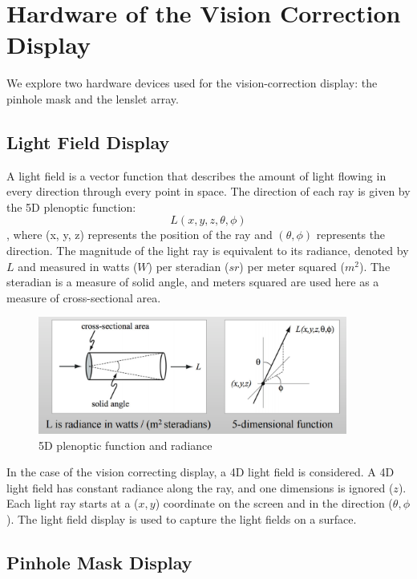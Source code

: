 \chapter{Hardware of the Vision Correction Display}

We explore two hardware devices used for the vision-correction display: the pinhole mask and the lenslet array.

\section{Light Field Display}
A light field is a vector function that describes the amount of light flowing in every direction through every point in space. The direction of each ray is given by the 5D plenoptic function: $$L(x, y, z, \theta, \phi)$$, where (x, y, z) represents the position of the ray and $(\theta, \phi)$ represents the direction. The magnitude of the light ray is equivalent to its radiance, denoted by $L$ and measured in watts ($W$) per steradian ($sr$) per meter squared ($m^2$). The steradian is a measure of solid angle, and meters squared are used here as a measure of cross-sectional area.

\begin{figure}[ht]
  \centering
  \includegraphics[width=4in]{chapters/chapter3/images/light_field.png}
  \caption{5D plenoptic function and radiance}
  \label{fig:ferrari}
\end{figure}




In the case of the vision correcting display, a 4D light field is considered. A 4D light field has constant radiance along the ray, and one dimensions is ignored ($z$). Each light ray starts at a ($x, y$) coordinate on the screen and in the direction ($\theta, \phi$). The light field display is used to capture the light fields on a surface.

\section{Pinhole Mask Display}

